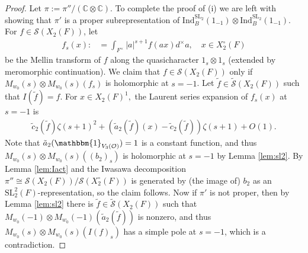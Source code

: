 \documentclass[11pt,a4paper,reqno]{amsart}
\theoremstyle{remark}
\numberwithin{equation}{section}
\newcommand{\SL}{\mathrm{SL}}
\newcommand{\OO}{\mathcal{O}}
\newcommand{\CC}{\mathbb{C}}
\theoremstyle{definition}
\numberwithin{equation}{section}
\newcommand{\one}{\mathbbm{1}}
\begin{document}
\begin{proof}
Let $\pi:=\pi''/(\CC\otimes \CC)$. 
To complete the proof of (i) we are left with showing that $\pi'$ is a proper subrepresentation of $\mathrm{Ind}_{B}^{\SL_2}(1_{-1})\otimes \mathrm{Ind}_{B}^{\SL_2}(1_{-1})$. For $f\in \mathcal{S}(X_{2}(F))$, let
\begin{align*}
    f_s(x):&=\int_{F^\times}|a|^{s+1}f(ax) d^\times a,\quad x\in X_{2}^\circ(F)
\end{align*}
be the Mellin transform of $f$ along the quasicharacter $1_{s}\otimes 1_{s}$  (extended by meromorphic continuation). We claim that $f\in \mathcal{S}(X_{2}(F))$ only if $M_{w_0}(s)\otimes M_{w_0}(s)(f_s)$ is holomorphic at $s=-1$. Let $\tilde{f}\in \widetilde{\mathcal{S}}(X_2(F))$ such that $I(\tilde{f})=f.$ For $x\in X_{2}(F)^1,$ the Laurent series expansion of $f_s(x)$ at $s=-1$ is
\begin{align*}
     \tilde{c}_2(\tilde{f})\zeta(s+1)^2+(\tilde{a}_2(\tilde{f})(x)-\tilde{c}_2(\tilde{f}))\zeta(s+1)+O(1).
\end{align*}
Note that $\tilde{a}_2(\one_{V_3(\OO)})=1$ is a constant function, and thus $M_{w_0}(s)\otimes M_{w_0}(s)((b_2)_s)$ is holomorphic at $s=-1$ by Lemma \ref{lem:sl2}. \sloppy By Lemma \ref{lem:Iact} and the Iwasawa decomposition $\pi''\cong \mathcal{S}(X_{2}(F))/\mathcal{S}(X_{2}^\circ(F))$ is generated by (the image of) $b_2$ as an $\mathrm{\SL}^2_{2}(F)$-representation, so the claim follows. Now if $\pi'$ is not proper, then by Lemma \ref{lem:sl2} there is $\tilde{f}\in \widetilde{\mathcal{S}}(X_{2}(F))$ such that $M_{w_0}(-1)\otimes M_{w_0}(-1)(\tilde{a}_2(\tilde{f}))$ is nonzero, and thus $M_{w_0}(s)\otimes M_{w_0}(s)(I(f)_s)$ has a simple pole at $s=-1$, which is a contradiction.
    

\end{proof}
\end{document}

